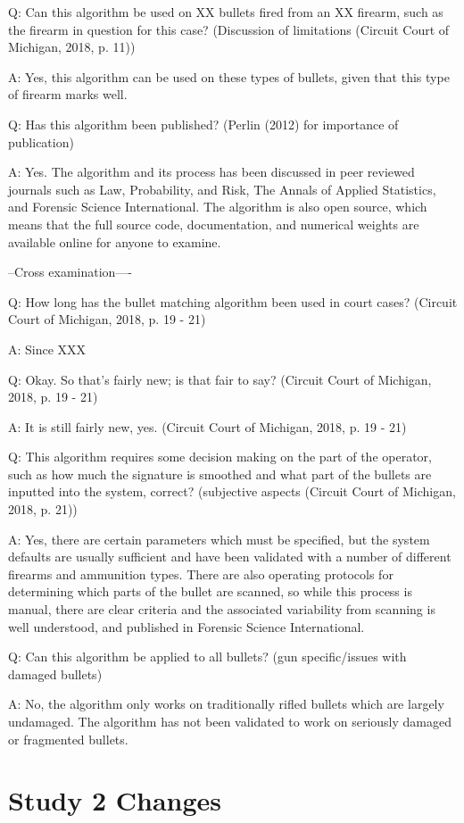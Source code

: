\documentclass[print]{nuthesis}
\begin{document}
Q: Can this algorithm be used on XX bullets fired from an XX firearm, such as the firearm in question for this case?
(Discussion of limitations (Circuit Court of Michigan, 2018, p. 11))

A: Yes, this algorithm can be used on these types of bullets, given that this type of firearm marks well.

Q: Has this algorithm been published? (Perlin (2012) for importance of publication)

A: Yes. The algorithm and its process has been discussed in peer reviewed journals such as Law, Probability, and Risk, The Annals of Applied Statistics, and Forensic Science International.
The algorithm is also open source, which means that the full source code, documentation, and numerical weights are available online for anyone to examine.

--Cross examination----

Q: How long has the bullet matching algorithm been used in court cases? (Circuit Court of Michigan, 2018, p. 19 - 21)

A: Since XXX

Q: Okay. So that's fairly new; is that fair to say? (Circuit Court of Michigan, 2018, p. 19 - 21)

A: It is still fairly new, yes. (Circuit Court of Michigan, 2018, p. 19 - 21)

Q: This algorithm requires some decision making on the part of the operator, such as how much the signature is smoothed and what part of the bullets are inputted into the system, correct? (subjective aspects (Circuit Court of Michigan, 2018, p. 21))

A: Yes, there are certain parameters which must be specified, but the system defaults are usually sufficient and have been validated with a number of different firearms and ammunition types.
There are also operating protocols for determining which parts of the bullet are scanned, so while this process is manual, there are clear criteria and the associated variability from scanning is well understood, and published in Forensic Science International.

Q: Can this algorithm be applied to all bullets? (gun specific/issues with damaged bullets)

A: No, the algorithm only works on traditionally rifled bullets which are largely undamaged.
The algorithm has not been validated to work on seriously damaged or fragmented bullets.

\hypertarget{study-2-changes}{%
\chapter{Study 2 Changes}\label{study-2-changes}}
\end{document}
